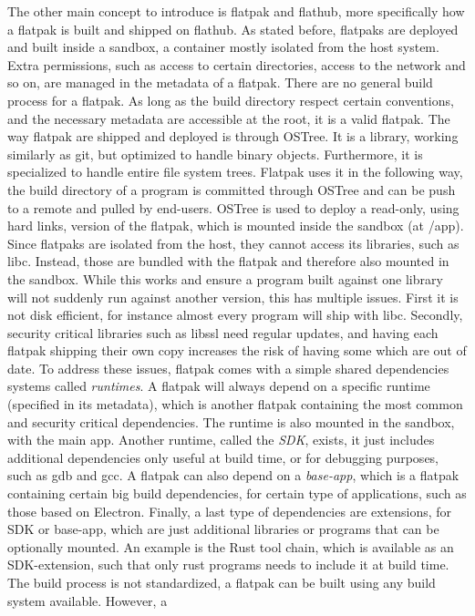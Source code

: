\documentclass[a4paper,11pt,oneside]{report}
\theoremstyle{definition}
\newcommand{\fp}{flatpak\xspace}
\newcommand{\Fp}{Flatpak\xspace}
\newcommand{\fh}{flathub\xspace}
\newcommand{\ot}{OSTree\xspace}
\begin{document}
The other main concept to introduce is \fp and \fh, more specifically how a \fp
is built and shipped on \fh. As stated before, flatpaks are deployed and built
inside a sandbox, a container mostly isolated from the host system. Extra
permissions, such as access to certain directories, access to the network and
so on, are managed in the metadata of a \fp. There are no general build process
for a \fp. As long as the build directory respect certain conventions, and the
necessary metadata are accessible at the root, it is a valid \fp. The way \fp
are shipped and deployed is through \ot. It is a library, working similarly as
git, but optimized to handle binary objects. Furthermore, it is specialized to
handle entire file system trees. \Fp uses it in the following way, the build
directory of a program is committed through \ot and can be push to a remote and
pulled by end-users. \ot is used to deploy a read-only, using hard links,
version of the \fp, which is mounted inside the sandbox (at /app). Since
flatpaks are isolated from the host, they cannot access its libraries, such as
libc. Instead, those are bundled with the \fp and therefore also mounted in the
sandbox. While this works and ensure a program built against one library will
not suddenly run against another version, this has multiple issues. First it is
not disk efficient, for instance almost every program will ship with libc.
Secondly, security critical libraries such as libssl need regular updates, and
having each \fp shipping their own copy increases the risk of having some which
are out of date. To address these issues, \fp comes with a simple shared
dependencies systems called \emph{runtimes}. A \fp will always depend on a
specific runtime (specified in its metadata), which is another \fp containing
the most common and security critical dependencies. The runtime is also mounted
in the sandbox, with the main app. Another runtime, called the \emph{SDK},
exists, it just includes additional dependencies only useful at build time, or
for debugging purposes, such as gdb and gcc. A \fp can also depend on a
\emph{base-app}, which is a \fp containing certain big build dependencies, for
certain type of applications, such as those based on Electron. Finally, a last
type of dependencies are extensions, for SDK or base-app, which are just
additional libraries or programs that can be optionally mounted. An example is
the Rust tool chain, which is available as an SDK-extension, such that only
rust programs needs to include it at build time. The build process is not
standardized, a \fp can be built using any build system available. However, a
\end{document}
